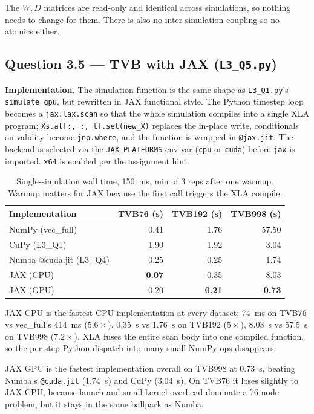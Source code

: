 \documentclass[11pt,a4paper]{article}
\newcommand{\Q}[1]{\subsection*{Question #1}}
\begin{document}
The $W, D$ matrices are read-only and identical across simulations, so
nothing needs to change for them. There is also no inter-simulation
coupling so no atomics either.

\Q{3.5 — TVB with JAX (\texttt{L3\_Q5.py})}

\textbf{Implementation.} The simulation function is the same shape as
\texttt{L3\_Q1.py}'s \texttt{simulate\_gpu}, but rewritten in JAX
functional style. The Python timestep loop becomes a
\texttt{jax.lax.scan} so that the whole simulation compiles into a
single XLA program; \texttt{Xs.at[:, :, t].set(new\_X)} replaces the
in-place write, conditionals on validity become \texttt{jnp.where}, and
the function is wrapped in \texttt{@jax.jit}. The backend is selected
via the \texttt{JAX\_PLATFORMS} env var (\texttt{cpu} or \texttt{cuda})
before \texttt{jax} is imported. \texttt{x64} is enabled per the
assignment hint.

\begin{table}[h]
\centering
\small
\begin{tabular}{lrrr}
\toprule
Implementation & TVB76 (s) & TVB192 (s) & TVB998 (s) \\
\midrule
NumPy (vec\_full)        & 0.41 & 1.76  & 57.50 \\
CuPy (L3\_Q1)            & 1.90 & 1.92  & 3.04 \\
Numba @cuda.jit (L3\_Q4) & 0.25 & 0.25  & 1.74 \\
JAX (CPU)                & \textbf{0.07} & 0.35  & 8.03 \\
JAX (GPU)                & 0.20 & \textbf{0.21}  & \textbf{0.73} \\
\bottomrule
\end{tabular}
\caption{Single-simulation wall time, 150~ms, min of 3 reps after one
warmup. Warmup matters for JAX because the first call triggers the XLA
compile.}
\end{table}

JAX CPU is the fastest CPU implementation at every dataset: 74~ms on
TVB76 vs vec\_full's 414~ms ($5.6\times$), 0.35~s vs 1.76~s on
TVB192 ($5\times$), 8.03~s vs 57.5~s on TVB998 ($7.2\times$). XLA
fuses the entire scan body into one compiled function, so the
per-step Python dispatch into many small NumPy ops disappears.

JAX GPU is the fastest implementation overall on TVB998 at 0.73~s,
beating Numba's \texttt{@cuda.jit} (1.74~s) and CuPy (3.04~s). On
TVB76 it loses slightly to JAX-CPU, because launch and small-kernel
overhead dominate a 76-node problem, but it stays in the same
ballpark as Numba.
\end{document}
